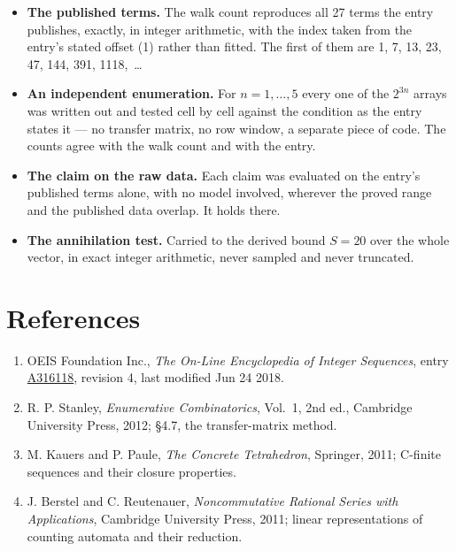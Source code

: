\documentclass[11pt]{article}
\theoremstyle{definition}
\begin{document}
\begin{itemize}

\item {\bfseries The published terms.} The walk count reproduces all 27 terms the entry publishes, exactly, in integer arithmetic, with the index taken from the entry's stated offset (1) rather than fitted. The first of them are 1, 7, 13, 23, 47, 144, 391, 1118,~\dots

\item {\bfseries An independent enumeration.} For $n = 1,\dots,5$ every one of the $2^{3n}$ arrays was written out and tested cell by cell against the condition as the entry states it --- no transfer matrix, no row window, a separate piece of code. The counts agree with the walk count and with the entry.

\item {\bfseries The claim on the raw data.} Each claim was evaluated on the entry's published terms alone, with no model involved, wherever the proved range and the published data overlap. It holds there.

\item {\bfseries The annihilation test.} Carried to the derived bound $S = 20$ over the whole vector, in exact integer arithmetic, never sampled and never truncated.

\end{itemize}

\section{References}

\begin{enumerate}

\item OEIS Foundation Inc., \emph{The On-Line Encyclopedia of Integer Sequences}, entry \href{https://oeis.org/A316118}{A316118}, revision 4, last modified Jun 24 2018.

\item R. P. Stanley, \emph{Enumerative Combinatorics}, Vol.~1, 2nd ed., Cambridge University Press, 2012; \S4.7, the transfer-matrix method.

\item M. Kauers and P. Paule, \emph{The Concrete Tetrahedron}, Springer, 2011; C-finite sequences and their closure properties.

\item J. Berstel and C. Reutenauer, \emph{Noncommutative Rational Series with Applications}, Cambridge University Press, 2011; linear representations of counting automata and their reduction.

\end{enumerate}
\end{document}
